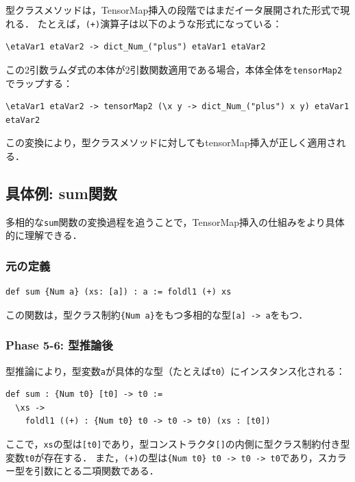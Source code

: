 型クラスメソッドは，TensorMap挿入の段階ではまだイータ展開された形式で現れる．
たとえば，\lstinline{(+)}演算子は以下のような形式になっている：
\begin{lstlisting}[language=egison,numbers=none]
\etaVar1 etaVar2 -> dict_Num_("plus") etaVar1 etaVar2
\end{lstlisting}

この2引数ラムダ式の本体が2引数関数適用である場合，本体全体を\lstinline{tensorMap2}でラップする：
\begin{lstlisting}[language=egison,numbers=none]
\etaVar1 etaVar2 -> tensorMap2 (\x y -> dict_Num_("plus") x y) etaVar1 etaVar2
\end{lstlisting}

この変換により，型クラスメソッドに対してもtensorMap挿入が正しく適用される．

\subsection{具体例: sum関数}

多相的な\lstinline{sum}関数の変換過程を追うことで，TensorMap挿入の仕組みをより具体的に理解できる．

\subsubsection{元の定義}

\begin{lstlisting}[language=egison,numbers=none]
def sum {Num a} (xs: [a]) : a := foldl1 (+) xs
\end{lstlisting}

この関数は，型クラス制約\lstinline|{Num a}|をもつ多相的な型\lstinline{[a] -> a}をもつ．

\subsubsection{Phase 5-6: 型推論後}

型推論により，型変数\lstinline{a}が具体的な型（たとえば\lstinline{t0}）にインスタンス化される：

\begin{lstlisting}[language=egison,numbers=none]
def sum : {Num t0} [t0] -> t0 :=
  \xs ->
    foldl1 ((+) : {Num t0} t0 -> t0 -> t0) (xs : [t0])
\end{lstlisting}

ここで，\lstinline{xs}の型は\lstinline{[t0]}であり，型コンストラクタ\lstinline{[]}の内側に型クラス制約付き型変数\lstinline{t0}が存在する．
また，\lstinline{(+)}の型は\lstinline|{Num t0} t0 -> t0 -> t0|であり，スカラー型を引数にとる二項関数である．

